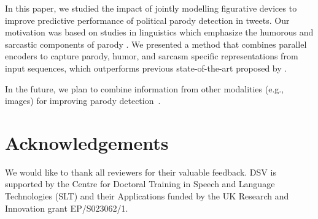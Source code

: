 \documentclass[11pt]{article}
\begin{document}
In this paper, we studied the impact of jointly modelling figurative devices to improve predictive performance of political parody detection in tweets. Our motivation was based on  studies in linguistics which emphasize the humorous and sarcastic components of parody \citep{haiman1998talk,Parody_Humor}. We presented a method that combines parallel encoders to capture parody, humor, and sarcasm specific representations from input sequences, which outperforms previous state-of-the-art proposed by \citet{maronikolakis-etal-2020-analyzing}. %

In the future, we plan to combine information from other modalities (e.g., images) for improving parody detection~\citep{sanchez-villegas-aletras-2021-point,sanchez-villegas-etal-2021-analyzing}.


\section*{Acknowledgements}
We would like to thank all reviewers for their valuable feedback. DSV is supported by the Centre for Doctoral Training in Speech and Language Technologies (SLT) and their Applications funded by the
UK Research and Innovation grant EP/S023062/1.




\appendix
\clearpage




\end{document}
